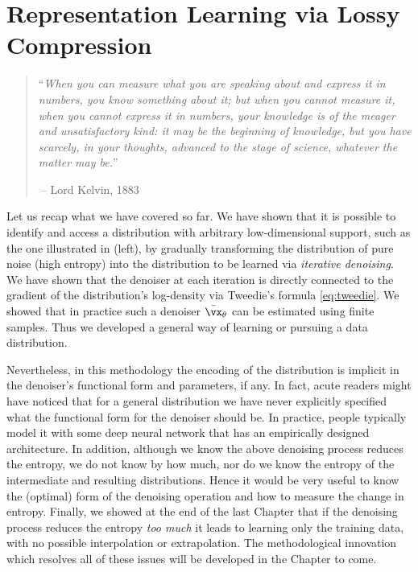 \documentclass[../../book-main.tex]{subfiles}
\begin{document}
\chapter{Representation Learning via Lossy Compression}
\label{ch:lossy-compression}



\begin{quote}
    ``{\em When you can measure what you are speaking
    about and express it in numbers, you know something
    about it; but when you cannot measure it, when you
    cannot express it in numbers, your knowledge is of
    the meager and unsatisfactory kind: it may be the
    beginning of knowledge, but you have scarcely, in your
    thoughts, advanced to the stage of science, whatever
    the matter may be.}''

    $~$\hfill -- Lord Kelvin, 1883
\end{quote}
\vspace{5mm}

Let us recap what we have covered so far. We have shown that it is
possible to identify and access a distribution with arbitrary
low-dimensional support, such as the one illustrated in
 (left), by gradually transforming
the distribution of pure noise (high entropy) into the
distribution to be learned via \textit{iterative denoising}. We have
shown that the denoiser at each iteration is directly connected to
the gradient of the distribution's log-density via Tweedie's
formula \eqref{eq:tweedie}. We showed that in practice such a denoiser
\(\bar{\vx}_{\theta}\) can be estimated using finite samples. Thus
we developed a general way of learning or pursuing a data distribution.

Nevertheless, in this methodology the
encoding of the distribution is implicit in the denoiser's functional
form and parameters, if any. In fact, acute readers might have
noticed that for a general distribution we have never explicitly
specified what the functional form for the denoiser should be. In practice,
people typically model it with some deep neural network that has an
empirically designed architecture. In addition, although we know the
above denoising process reduces the entropy, we do not know by how
much, nor do we know the entropy of the intermediate and resulting
distributions. Hence it would be very useful to know the (optimal)
form of the denoising operation and how to measure the change in
entropy. Finally, we showed at the end of the last Chapter that if
the denoising process reduces the entropy \textit{too much} it leads
to learning only the training data, with no possible interpolation or
extrapolation. The methodological innovation which resolves all of
these issues will be developed in the Chapter to come.
\end{document}
